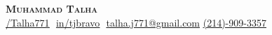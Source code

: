 \documentclass{article}%
\begin{document}
%
\normalsize%

\begin{description}
    \item 
        \begin{center}
            \textbf{\Huge \scshape Muhammad Talha} \\ \vspace{8pt}
            \small 
            \href{https://github.com/Talha771}{\underline{/Talha771}} $  $
            \href{https://linkedin.com/in/tjbravo}{\underline{in/tjbravo}} $  $
            \href{mailto:talha.j771@gmail.com}{\underline{talha.j771@gmail.com}}
            \href{tel:0012149093357}{\underline{(214)-909-3357}}
        \end{center}
\end{description}
%
\end{document}
